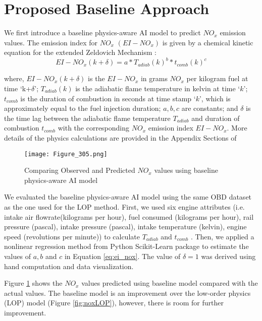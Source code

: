 \documentclass[letterpaper]{article} %
\begin{document}
\section{Proposed Baseline Approach}
We first introduce a baseline physics-aware AI model to predict $NO_{x}$ emission values. The emission index for $NO_{x}$  $(EI-NO_{x})$ is given by a chemical kinetic equation for the extended Zeldovich Mechanism \cite{10.2307/44746494} : \begin{equation}\label{eq:ei_nox}
    EI-NO_{x} (k+ \delta)= a * T_{adiab}(k)^{b} * t_{comb}(k)^{c}
\end{equation}

\noindent where, $EI-NO_{x}(k+\delta)$ is the $EI-NO_{x}$ in grams $NO_{x}$ per kilogram fuel at time `k+$\delta$'; $T_{adiab}(k)$ is the adiabatic flame temperature in kelvin at time `$k$'; $t_{comb}$ is the duration of combustion in seconds at time stamp `$k$', which is approximately equal to the fuel injection duration; $a, b, c$ are constants; and $\delta$ is the time lag between the adiabatic flame temperature $T_{adiab}$ and duration of combustion $t_{comb}$ with the corresponding $NO_x$ emission index $EI-NO_x$. More details of the physics calculations are provided in the Appendix Sections of  \cite{panneerselvam2020}

\begin{figure}[h!]
    \centering
    \texttt{[image:  Figure\_305.png]}
    \caption{Comparing Observed and Predicted $NO_{x}$ values using baseline physics-aware AI model}
    \label{fig:noxbaseline}
\end{figure}


We evaluated the baseline physics-aware AI model using the same OBD dataset as the one used for the LOP method. First, we used six engine attributes (i.e. intake air flowrate(kilograms per hour), fuel consumed (kilograms per hour), rail pressure (pascal), intake pressure (pascal), intake temperature (kelvin), engine speed (revolutions per minute)) to calculate $T_{adiab}$ and $t_{comb}$ . Then, we applied a nonlinear regression method from Python Scikit-Learn package \cite{JMLR:v12:pedregosa11a} to estimate the values of $a, b$ and $c$ in Equation \ref{eq:ei_nox}. The value of $\delta = 1$ was derived using hand computation and data visualization.

Figure \ref{fig:noxbaseline} shows the $NO_{x}$ values predicted using baseline model compared with the actual values. The baseline model is an improvement over the low-order physics (LOP) model (Figure \ref{fig:noxLOP}), however, there is room for further improvement.
\end{document}
